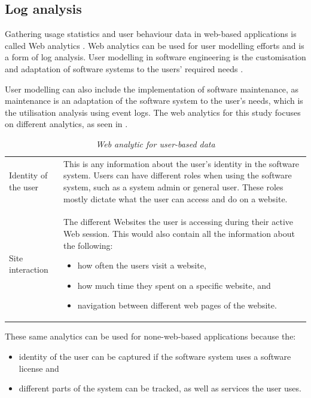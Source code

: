 \subsection{Log analysis}\label{sec:ch1_systemUtilisation}
Gathering usage statistics and user behaviour data in web-based applications is called Web analytics \cite{Kocsis2012}. Web analytics can be used for user modelling efforts and is a form of log analysis. User modelling in software engineering is the customisation and adaptation of software systems to the users' required needs \cite{Waqar2017, Paliouras1999}. \par User modelling can also include the implementation of software maintenance, as maintenance is an adaptation of the software system to the user's needs, which is the utilisation analysis using event logs. The web analytics for this study focuses on different analytics, as seen in . 

\begin{table}[!htb]
	\centering
	\caption[Web analytic for user-based data]
	{\textit{Web analytic for user-based data}}
	\label{tbl:ch1_webAnalytics}
	\begin{tabularx}{\textwidth}{lX}
		\toprule 
		\thead{Analytic}  & \thead{Description} \\
		\midrule

		\rowcolor{lightgray}
		Identity of the user & This is any information about the user's identity in the software system. Users can have different roles when using the software system, such as a system admin or general user. These roles mostly dictate what the user can access and do on a website. \\

		Site interaction & The different Websites the user is accessing during their active Web session. This would also contain all the information about the following: 
		\begin{itemize}
			\item how often the users visit a website,
			\item how much time they spent on a specific website, and
			\item navigation between different web pages of the website.
		\end{itemize}
		\\
		\bottomrule
	\end{tabularx}
\end{table}

These same analytics can be used for none-web-based applications because the: 
\begin{itemize}
	\item identity of the user can be captured if the software system uses a software license and
	\item different parts of the system can be tracked, as well as services the user uses.
\end{itemize} 

